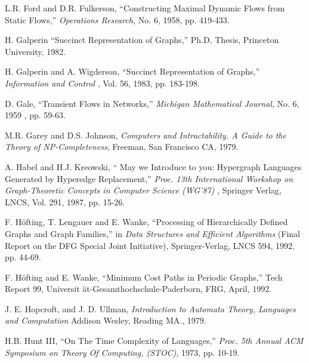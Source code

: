 \begin{thebibliography}{HMRR93}
L.R. Ford and D.R. Fulkerson,
``Constructing Maximal Dynamic Flows from Static Flows,''
{\em Operations Research,}
No. 6, 1958, pp. 419-433.




 H. Galperin 
``Succinct Representation of Graphs,''
Ph.D. Thesis, Princeton University, 1982.





H. Galperin and A. Wigderson,
``Succinct Representation of Graphs,''
{\em Information and Control }, 
Vol. 56, 1983, pp. 183-198.






D. Gale,
``Transient Flows in Networks,''
{\em Michigan Mathematical Journal},
No. 6, 1959 , pp. 59-63.





M.R. Garey and  D.S. Johnson,
{\em Computers and Intractability. A Guide to the Theory of NP-Completeness},
Freeman, San Francisco CA, 1979.





A. Habel and H.J. Kreowski,
`` May we Introduce to you: Hypergraph Languages Generated by 
Hyperedge Replacement,'' 
{\em Proc. 13th International 
Workshop on Graph-Theoretic Concepts in Computer Science (WG'87) }, 
Springer Verlag, LNCS, Vol. 291, 1987, pp. 15-26.




F. H\"ofting, T. Lengauer and E. Wanke,
``Processing of Hierarchically Defined Graphs and 
Graph Families,'' in
{\em Data Structures and Efficient Algorithms}
(Final Report on the DFG Special Joint Initiative),
Springer-Verlag, LNCS 594, 1992, pp. 44-69.


F. H\"ofting and E. Wanke,
``Minimum Cost Paths in Periodic  Graphs,''
Tech Report 99, Universit \"at-Gesamthochschule-Paderborn, FRG,  
April, 1992. 



J. E. Hopcroft, and J. D. Ullman,
{\em Introduction to Automata Theory, Languages and Computation}
Addison Wesley, Reading MA., 1979.




 H.B. Hunt III,
``On The Time Complexity of Languages,''
{\em Proc.  5th Annual ACM Symposium on Theory Of Computing, (STOC)}, 
1973, pp. 10-19.







\end{thebibliography}
